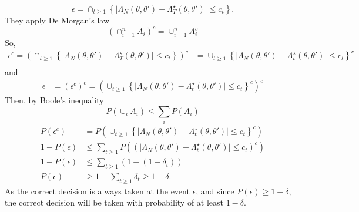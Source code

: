 \begin{equation}\label{eq:epsilon}
    \mathbb{\epsilon} = \cap_{t\geq 1}\left\{\mid\Lambda_N\left(\theta, \theta'\right) - \Lambda_T^{\star} \left(\theta, \theta'\right) \mid \leq c_t\right\}.   
\end{equation}
They apply De Morgan's law 
\begin{equation}
    \left(\cap_{i=1}^n A_i\right)^c = \cup_{i=1}^n A_i^c
\end{equation}
So, 
\begin{equation}
\begin{split}
     \epsilon^c = \left(\cap _{t\geq 1}\left\{\mid \Lambda_N\left(\theta, \theta'\right) - \Lambda_T^{\star}\left(\theta, \theta'\right) \mid \leq c_t\right\}\right)^c &= \cup_{t\geq 1} \left\{\mid \Lambda_N\left(\theta, \theta'\right) - \Lambda_t^{\star}\left(\theta, \theta'\right) \mid \leq c_t\right\}^c \\
\end{split}
\end{equation}
and 
\begin{equation}
\begin{split}
    \epsilon &= \left(\epsilon^c\right)^c = \left(\cup_{t\geq 1} \left\{\mid \Lambda_N\left(\theta, \theta'\right) - \Lambda_t^{\star}\left(\theta, \theta'\right) \mid \leq c_t \right\}^c\right)^c 
\end{split}
\end{equation}{}
Then, by Boole's inequality
\begin{equation}\label{eq:Boole}
    P\left(\cup_i A_i \right) \leq \sum_{i} P\left(A_i\right)
\end{equation}
\begin{equation}
\begin{split}
       P\left(\epsilon^c\right) &= P\left(\cup_{t\geq 1} \left\{\mid\Lambda_N\left(\theta, \theta'\right)- \Lambda_t^{\star}\left(\theta, \theta'\right) \mid \leq c_t\right\}^c\right) \\
    1 - P\left(\epsilon\right) &\leq \sum_{t\geq 1} P\left(\left(\mid \Lambda_N\left(\theta, \theta'\right) - \Lambda_t^{\star}\left(\theta, \theta'\right) \mid \leq c_t \right)^c\right) \\ 
    1 - P\left(\epsilon\right) &\leq \sum_{t\geq 1} \left(1 - \left(1 - \delta_t\right)\right) \\
    P\left(\epsilon\right) &\geq 1 - \sum_{t\geq 1} \delta_t \geq 1 - \delta.  
\end{split}
\end{equation}
As the correct decision is always taken at the event $\epsilon$, and since $P\left(\epsilon\right)\geq 1- \delta$, the correct decision will be taken with probability of at least $1 - \delta$. 

